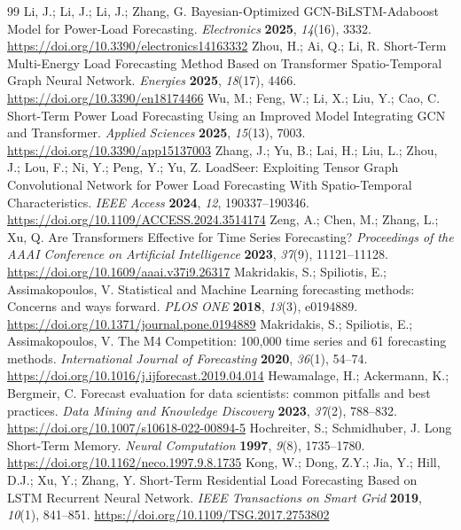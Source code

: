 \documentclass[electronics,article,submit,moreauthors]{Definitions/mdpi}
\begin{document}
\begin{thebibliography}{99}
 Li, J.; Li, J.; Li, J.; Zhang, G. Bayesian-Optimized GCN-BiLSTM-Adaboost Model for Power-Load Forecasting. \emph{Electronics} \textbf{2025}, \emph{14}(16), 3332. \url{https://doi.org/10.3390/electronics14163332}
 Zhou, H.; Ai, Q.; Li, R. Short-Term Multi-Energy Load Forecasting Method Based on Transformer Spatio-Temporal Graph Neural Network. \emph{Energies} \textbf{2025}, \emph{18}(17), 4466. \url{https://doi.org/10.3390/en18174466}
 Wu, M.; Feng, W.; Li, X.; Liu, Y.; Cao, C. Short-Term Power Load Forecasting Using an Improved Model Integrating GCN and Transformer. \emph{Applied Sciences} \textbf{2025}, \emph{15}(13), 7003. \url{https://doi.org/10.3390/app15137003}
 Zhang, J.; Yu, B.; Lai, H.; Liu, L.; Zhou, J.; Lou, F.; Ni, Y.; Peng, Y.; Yu, Z. LoadSeer: Exploiting Tensor Graph Convolutional Network for Power Load Forecasting With Spatio-Temporal Characteristics. \emph{IEEE Access} \textbf{2024}, \emph{12}, 190337--190346. \url{https://doi.org/10.1109/ACCESS.2024.3514174}
 Zeng, A.; Chen, M.; Zhang, L.; Xu, Q. Are Transformers Effective for Time Series Forecasting? \emph{Proceedings of the AAAI Conference on Artificial Intelligence} \textbf{2023}, \emph{37}(9), 11121--11128. \url{https://doi.org/10.1609/aaai.v37i9.26317}
 Makridakis, S.; Spiliotis, E.; Assimakopoulos, V. Statistical and Machine Learning forecasting methods: Concerns and ways forward. \emph{PLOS ONE} \textbf{2018}, \emph{13}(3), e0194889. \url{https://doi.org/10.1371/journal.pone.0194889}
 Makridakis, S.; Spiliotis, E.; Assimakopoulos, V. The M4 Competition: 100,000 time series and 61 forecasting methods. \emph{International Journal of Forecasting} \textbf{2020}, \emph{36}(1), 54--74. \url{https://doi.org/10.1016/j.ijforecast.2019.04.014}
 Hewamalage, H.; Ackermann, K.; Bergmeir, C. Forecast evaluation for data scientists: common pitfalls and best practices. \emph{Data Mining and Knowledge Discovery} \textbf{2023}, \emph{37}(2), 788--832. \url{https://doi.org/10.1007/s10618-022-00894-5}
 Hochreiter, S.; Schmidhuber, J. Long Short-Term Memory. \emph{Neural Computation} \textbf{1997}, \emph{9}(8), 1735--1780. \url{https://doi.org/10.1162/neco.1997.9.8.1735}
 Kong, W.; Dong, Z.Y.; Jia, Y.; Hill, D.J.; Xu, Y.; Zhang, Y. Short-Term Residential Load Forecasting Based on LSTM Recurrent Neural Network. \emph{IEEE Transactions on Smart Grid} \textbf{2019}, \emph{10}(1), 841--851. \url{https://doi.org/10.1109/TSG.2017.2753802}

\end{thebibliography}
\end{document}
